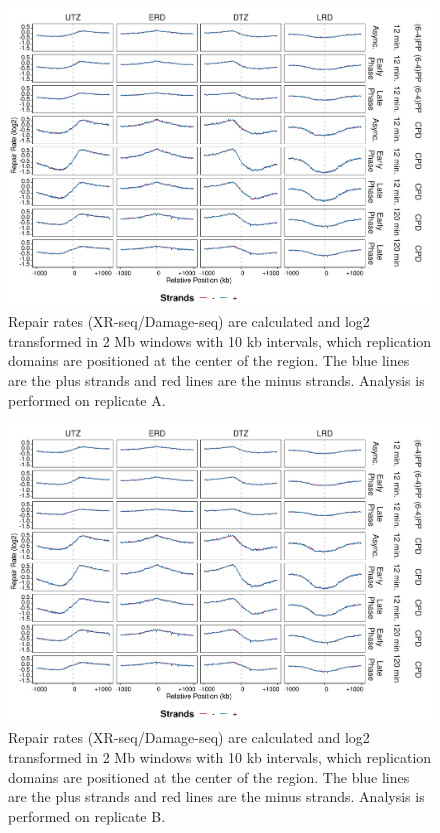 \begin{figure}[H]
\begin{center}
\includegraphics[width=\textwidth]{Chapters/7_appendix/figures/supfig22}
\caption[Repair rates of replication domains in 2 Mb (replicate A).]{Repair rates (XR-seq/Damage-seq) are calculated and log2 transformed in 2 Mb windows with 10 kb intervals, which replication domains are positioned at the center of the region. The blue lines are the plus strands and red lines are the minus strands. Analysis is performed on replicate A.}
\label{supfig:repairrate2000repdomainA}
\end{center}
\end{figure}

\begin{figure}[H]
\begin{center}
\includegraphics[width=\textwidth]{Chapters/7_appendix/figures/supfig23}
\caption[Repair rates of replication domains in 2 Mb (replicate B).]{Repair rates (XR-seq/Damage-seq) are calculated and log2 transformed in 2 Mb windows with 10 kb intervals, which replication domains are positioned at the center of the region. The blue lines are the plus strands and red lines are the minus strands. Analysis is performed on replicate B.}
\label{supfig:repairrate2000repdomainB}
\end{center}
\end{figure}

